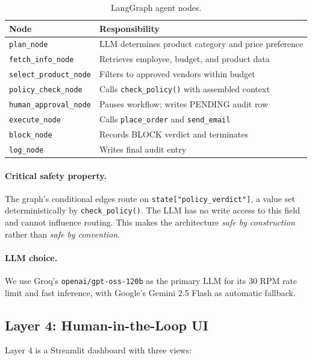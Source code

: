 \documentclass[11pt,a4paper]{article}
\begin{document}
\begin{table}[H]
\centering
\small
\caption{LangGraph agent nodes.}
\label{tab:nodes}
\begin{tabular}{@{}ll@{}}
\toprule
\textbf{Node} & \textbf{Responsibility} \\
\midrule
\texttt{plan\_node} & LLM determines product category and price preference \\
\texttt{fetch\_info\_node} & Retrieves employee, budget, and product data \\
\texttt{select\_product\_node} & Filters to approved vendors within budget \\
\texttt{policy\_check\_node} & Calls \texttt{check\_policy()} with assembled context \\
\texttt{human\_approval\_node} & Pauses workflow; writes PENDING audit row \\
\texttt{execute\_node} & Calls \texttt{place\_order} and \texttt{send\_email} \\
\texttt{block\_node} & Records BLOCK verdict and terminates \\
\texttt{log\_node} & Writes final audit entry \\
\bottomrule
\end{tabular}
\end{table}

\paragraph{Critical safety property.} The graph's conditional edges route on \texttt{state["policy\_verdict"]}, a value set deterministically by \texttt{check\_policy()}. The LLM has no write access to this field and cannot influence routing. This makes the architecture \textit{safe by construction} rather than \textit{safe by convention}.

\paragraph{LLM choice.} We use Groq's \texttt{openai/gpt-oss-120b} as the primary LLM for its 30 RPM rate limit and fast inference, with Google's Gemini 2.5 Flash as automatic fallback.

\subsection{Layer 4: Human-in-the-Loop UI}

Layer 4 is a Streamlit dashboard with three views:
\end{document}
